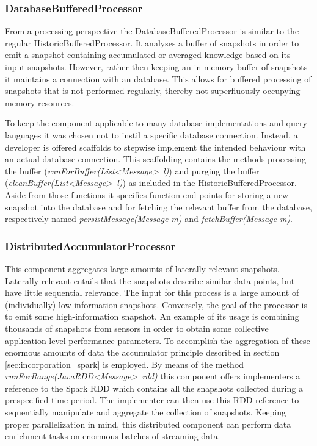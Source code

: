 \subsubsection{DatabaseBufferedProcessor}
From a processing perspective the DatabaseBufferedProcessor is similar to the regular HistoricBufferedProcessor. It analyses a buffer of snapshots in order to emit a snapshot containing accumulated or averaged knowledge based on its input snapshots. However, rather then keeping an in-memory buffer of snapshots it maintains a connection with an database. This allows for buffered processing of snapshots that is not performed regularly, thereby not superfluously occupying memory resources.

To keep the component applicable to many database implementations and query languages it was chosen not to instil a specific database connection. Instead, a developer is offered scaffolds to stepwise implement the intended behaviour with an actual  database connection. This scaffolding contains the methods processing the buffer (\emph{runForBuffer(List\textless Message\textgreater\ l)}) and purging the buffer (\emph{cleanBuffer(List\textless Message\textgreater\ l)}) as included in the HistoricBufferedProcessor. Aside from those functions it specifies function end-points for storing a new snapshot into the database and for fetching the relevant buffer from the database, respectively named \emph{persistMessage(Message m)} and \emph{fetchBuffer(Message m)}.	

\subsubsection{DistributedAccumulatorProcessor}
This component aggregates large amounts of laterally relevant snapshots. Laterally relevant entails that the snapshots describe similar data points, but have little sequential relevance. The input for this process is a large amount of (individually) low-information snapshots. Conversely, the goal of the processor is to emit some high-information snapshot. An example of its usage is combining thousands of snapshots from sensors in order to obtain some collective application-level performance parameters. To accomplish the aggregation of these enormous amounts of data the accumulator principle described in section \ref{sec:incorporation_spark} is employed. By means of the method \emph{runForRange(JavaRDD\textless Message\textgreater\ rdd)} this component offers implementers a reference to the Spark RDD which contains all the snapshots collected during a prespecified time period. The implementer can then use this RDD reference to sequentially manipulate and aggregate the collection of snapshots. Keeping proper parallelization in mind, this distributed component can perform data enrichment tasks on enormous batches of streaming data.

